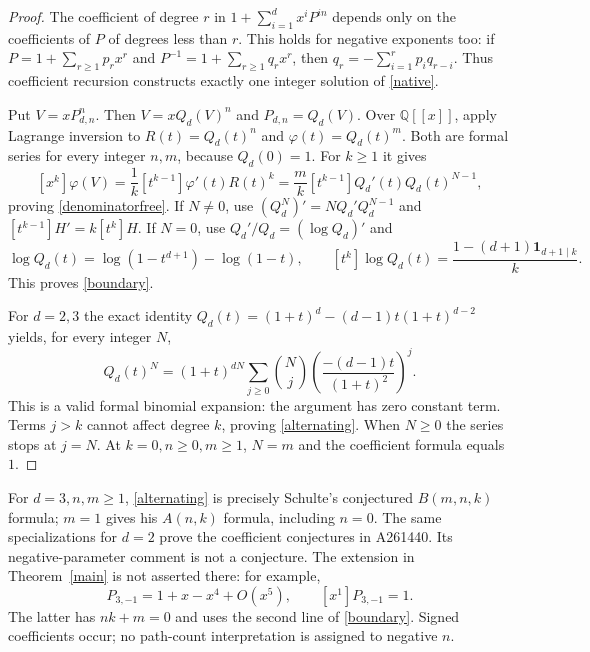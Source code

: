 \documentclass[11pt]{article}
\newcommand{\coef}[2]{[#1^{#2}]}
\begin{document}
\begin{proof}
The coefficient of degree $r$ in
$1+\sum_{i=1}^d x^iP^{in}$ depends only on the coefficients of $P$
of degrees less than $r$. This holds for negative exponents too: if
$P=1+\sum_{r\geq1}p_rx^r$ and $P^{-1}=1+\sum_{r\geq1}q_rx^r$, then
$q_r=-\sum_{i=1}^r p_iq_{r-i}$. Thus coefficient recursion constructs
exactly one integer solution of \eqref{native}.

Put $V=xP_{d,n}^n$. Then $V=xQ_d(V)^n$ and $P_{d,n}=Q_d(V)$.
Over $\mathbb Q[[x]]$, apply Lagrange inversion to
$R(t)=Q_d(t)^n$ and $\varphi(t)=Q_d(t)^m$. Both are formal series
for every integer $n,m$, because $Q_d(0)=1$. For $k\geq1$ it gives
\[
 \coef{x}{k}\varphi(V)
 =\frac1k\coef{t}{k-1}\varphi'(t)R(t)^k
 =\frac{m}{k}\coef{t}{k-1}Q_d'(t)Q_d(t)^{N-1},
\]
proving \eqref{denominatorfree}. If $N\ne0$, use
$(Q_d^N)'=NQ_d'Q_d^{N-1}$ and
$\coef{t}{k-1}H'=k\coef{t}{k}H$.
If $N=0$, use $Q_d'/Q_d=(\log Q_d)'$ and
\[
 \log Q_d(t)=\log(1-t^{d+1})-\log(1-t),\qquad
 \coef{t}{k}\log Q_d(t)=\frac{1-(d+1)\mathbf1_{d+1\mid k}}{k}.
\]
This proves \eqref{boundary}.

For $d=2,3$ the exact identity
$Q_d(t)=(1+t)^d-(d-1)t(1+t)^{d-2}$ yields, for every integer $N$,
\begin{equation}\label{polynomial}
 Q_d(t)^N=(1+t)^{dN}
 \sum_{j\geq0}\binom Nj\left(\frac{-(d-1)t}{(1+t)^2}\right)^j.
\end{equation}
This is a valid formal binomial expansion: the argument has zero
constant term. Terms $j>k$ cannot affect degree $k$, proving
\eqref{alternating}. When $N\geq0$ the series stops at $j=N$.
At $k=0,n\geq0,m\geq1$, $N=m$ and the coefficient formula equals $1$.
\end{proof}

For $d=3,n,m\geq1$, \eqref{alternating} is precisely Schulte's
conjectured $B(m,n,k)$ formula; $m=1$ gives his $A(n,k)$ formula,
including $n=0$. The same specializations for $d=2$ prove the coefficient
conjectures in A261440. Its negative-parameter comment is not a conjecture.
The extension in Theorem~\ref{main} is not asserted there: for example,
\[
 P_{3,-1}=1+x-x^4+O(x^5),\qquad \coef{x}{1}P_{3,-1}=1.
\]
The latter has $nk+m=0$ and uses the second line of \eqref{boundary}.
Signed coefficients occur; no path-count interpretation is assigned to
negative $n$.
\end{document}
